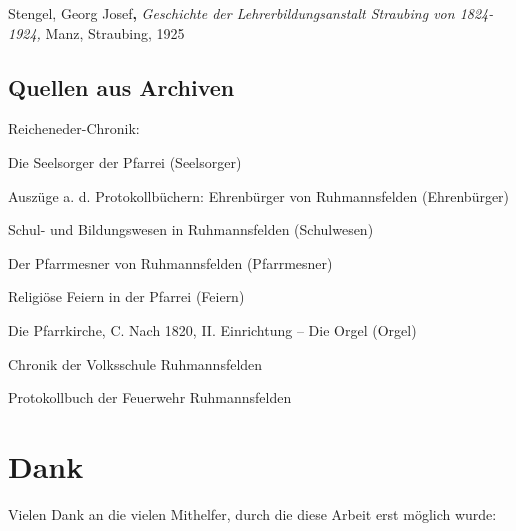 \documentclass{book}
\begin{document}
Stengel, Georg Josef\textbf{,} \textit{Geschichte der
Lehrerbildungsanstalt Straubing von 1824-1924, }Manz, Straubing, 1925

\subsection{Quellen aus Archiven}

Reicheneder-Chronik:

Die Seelsorger der Pfarrei (Seelsorger)

Auszüge a. d. Protokollbüchern: Ehrenbürger von Ruhmannsfelden
(Ehren\-bürger)

Schul- und Bildungswesen in Ruhmannsfelden (Schulwesen)

Der Pfarrmesner von Ruhmannsfelden (Pfarrmesner)

Religiöse Feiern in der Pfarrei (Feiern)

Die Pfarrkirche, C. Nach 1820, II. Einrichtung – Die Orgel (Orgel)

Chronik der Volksschule Ruhmannsfelden

Protokollbuch der Feuerwehr Ruhmannsfelden

\section{Dank}

Vielen Dank an die vielen Mithelfer, durch die diese Arbeit erst möglich
wurde:
\end{document}
